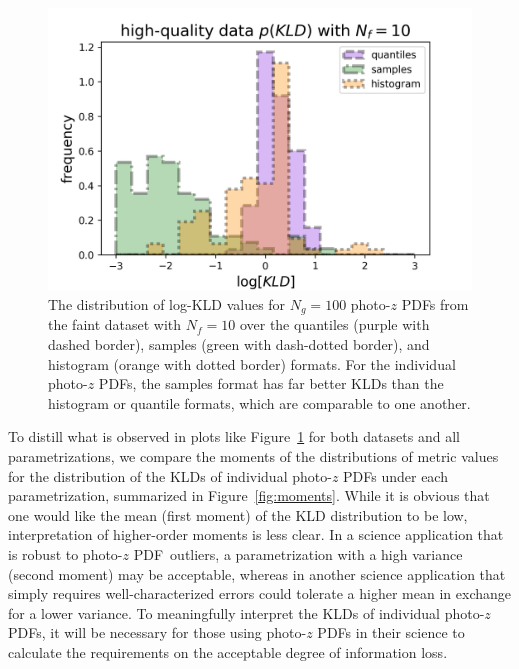 \documentclass[\docopts]{\docclass}
\newcommand{\pz}{photo-$z$ PDF}
\newcommand{\ssdata}{faint\xspace}
\begin{document}
\begin{figure}
  \begin{center}
    \includegraphics[width=\columnwidth]{figures/individual.png}
    \caption{The distribution of log-KLD values for $N_{g}=100$ \pz s from the 
\ssdata dataset with $N_{f}=10$ over the quantiles (purple with dashed border), 
samples (green with dash-dotted border), and histogram (orange with dotted 
border) formats.
    For the individual \pz s, the samples format has far better KLDs than the 
histogram or quantile formats, which are comparable to one another.
    \label{fig:individual}}
  \end{center}
\end{figure}

To distill what is observed in plots like Figure~\ref{fig:individual} for both 
datasets and all parametrizations, we compare the moments of the distributions 
of metric values for the distribution of the KLDs of individual \pz s under 
each parametrization, summarized in Figure~\ref{fig:moments}.
While it is obvious that one would like the mean (first moment) of the KLD 
distribution to be low, interpretation of higher-order moments is less clear.
In a science application that is robust to \pz\ outliers, a parametrization 
with a high variance (second moment) may be acceptable, whereas in another 
science application that simply requires well-characterized errors could 
tolerate a higher mean in exchange for a lower variance.
To meaningfully interpret the KLDs of individual \pz s, it will be necessary 
for those using \pz s in their science to calculate the requirements on the 
acceptable degree of information loss.
\end{document}
